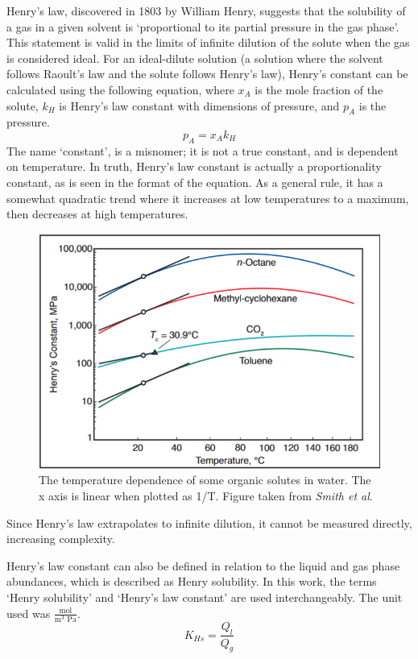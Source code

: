 \documentclass[11pt, titlepage]{article}
\begin{document}
Henry's law, discovered in 1803 by William Henry\cite{Henry1803}, suggests that the solubility of a gas in a given solvent is `proportional to its partial pressure in the gas phase'\cite{Sander}. This statement is valid in the limits of infinite dilution of the solute when the gas is considered ideal\cite{HL_IUPAC_Recs}. For an ideal-dilute solution (a solution where the solvent follows Raoult's law and the solute follows Henry's law), Henry's constant can be calculated using the following equation, where $x_A$ is the mole fraction of the solute, $k_H$ is Henry's law constant with dimensions of pressure, and $p_A$ is the pressure\cite{Atkins}.
\begin{equation}
	p_A = x_A k_H
	\label{eq:HenrysLaw}
\end{equation}
The name `constant', is a misnomer; it is not a true constant, and is dependent on temperature. In truth, Henry's law constant is actually a proportionality constant, as is seen in the format of the equation. As a general rule, it has a somewhat quadratic trend where it increases at low temperatures to a maximum, then decreases at high temperatures\cite{HLPitfalls}. 

\begin{figure}[H]
	\centering\small
	\includegraphics[width=0.5\linewidth]{figures/HenryTemp.png}
	\caption{The temperature dependence of some organic solutes in water. The x axis is linear when plotted as 1/T. Figure taken from \textit{Smith et al}\cite{HLPitfalls}.}
	\label{fig:HenryTemperatureDependence}
\end{figure}

Since Henry's law extrapolates to infinite dilution, it cannot be measured directly, increasing complexity.

Henry's law constant can also be defined in relation to the liquid and gas phase abundances, which is described as Henry solubility\cite{HL_IUPAC_Recs}. In this work, the terms `Henry solubility' and `Henry's law constant' are used interchangeably. The unit used was $\frac{\text{mol}}{\text{m}^3\text{ Pa}}$.
\begin{equation}
	K_{Hs} = \frac{Q_l}{Q_g}
	\label{eq:HenrySolubility}
\end{equation}
\end{document}
